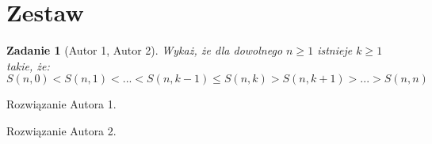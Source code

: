 \documentclass{mwart}
\newtheorem{zad}{Zadanie}[section]
\begin{document}
\newpage
\section{Zestaw}          %

\begin{zad}[Autor 1, Autor 2]
    Wykaż, że dla dowolnego $n \geq 1$ istnieje $k \geq 1$ takie, że:
    \[S(n, 0) < S(n, 1) < ... < S(n, k - 1 ) \leq S(n, k) > S(n, k+1) > ... > S(n, n)\]
\end{zad}
\begin{mdframed}
    Rozwiązanie Autora 1.
\end{mdframed}
\begin{mdframed}
    Rozwiązanie Autora 2.
\end{mdframed}
\end{document}
